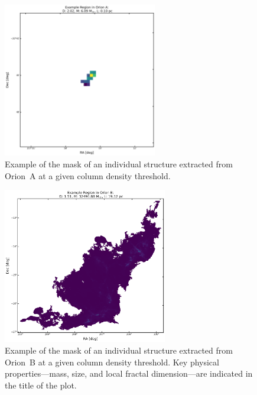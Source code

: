 \begin{figure}[h]
    \centering
    \includegraphics[width=0.6\textwidth]{figures/MSD_Gallery_Orion_A_5.png}
    \caption{Example of the mask of an individual structure extracted from Orion~A at a given column density threshold.}
    \label{fig:gallery_MSD_A_5}
\end{figure}

\newpage

\begin{figure}[h]
    \centering
    \includegraphics[width=0.64\textwidth]{figures/MSD_Gallery_Orion_B_1.png}
    \caption{Example of the mask of an individual structure extracted from Orion~B at a given column density threshold. Key physical properties—mass, size, and local fractal dimension—are indicated in the title of the plot.}
    \label{fig:gallery_MSD_B_1}
\end{figure}

